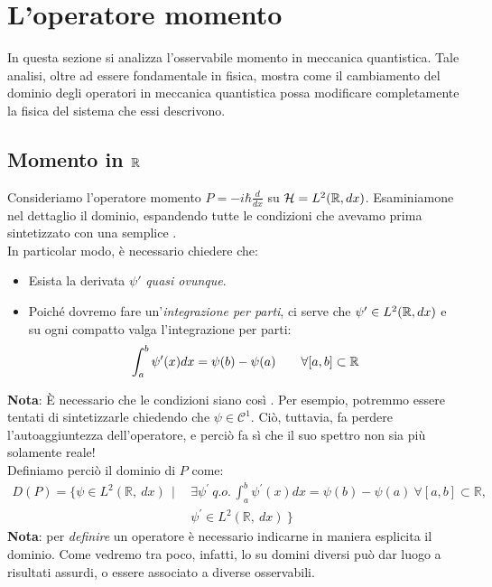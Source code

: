 \documentclass[../../FisicaTeorica.tex]{subfiles}
\begin{document}

\section{L'operatore momento}
In questa sezione si analizza l'osservabile momento in meccanica quantistica. Tale analisi, oltre ad essere fondamentale in fisica, mostra come il cambiamento del dominio degli operatori in meccanica quantistica possa modificare completamente la fisica del sistema che essi descrivono.
\subsection{Momento in $\mathbb{R}$}
Consideriamo l'operatore momento $P=-i\hbar \frac{d}{dx}$ su $\mathcal{H} = L^2(\bm{\mathbb{R}}, dx)$. Esaminiamone nel dettaglio il dominio, espandendo tutte le condizioni che avevamo prima sintetizzato con una semplice .\\
In particolar modo, è necessario chiedere che:
\begin{itemize}
    \item Esista la derivata $\psi'$ \textit{quasi ovunque}.
    \item Poiché dovremo fare un'\textit{integrazione per parti}, ci serve che $\psi' \in L^2(\mathbb{R}, dx)$ e su ogni compatto valga l'integrazione per parti:
    \[
    \int_a^b \psi'(x)dx = \psi(b)-\psi(a) \qquad \forall [a,b] \subset \mathbb{R}
    \]
\end{itemize}
\textbf{Nota}: È necessario che le condizioni siano così . Per esempio, potremmo essere tentati di sintetizzarle chiedendo che $\psi \in \mathcal C^1$. Ciò, tuttavia, fa perdere l'autoaggiuntezza dell'operatore, e perciò fa sì che il suo spettro non sia più solamente reale!\\
Definiamo perciò il dominio di $P$ come:
\begin{align*}
D\left(P\right)= \big\{\psi\in L^2\left(\mathbb{R},\ dx\right)\ \ |\ \ 
&\exists\psi^\prime\ q.o.\, \int_{a}^{b}{\psi^\prime\left(x\right)dx}=\psi\left(b\right)-\psi\left(a\right)\ \forall\left[a,b\right]\subset\mathbb{R},\\
&\psi^\prime\in L^2(\mathbb{R},\ dx)\ \big\}
\end{align*}
\textbf{Nota}: per \textit{definire} un operatore è necessario indicarne in maniera esplicita il dominio. Come vedremo tra poco, infatti, lo  su domini diversi può dar luogo a risultati assurdi, o essere associato a diverse osservabili.\\
\end{document}
